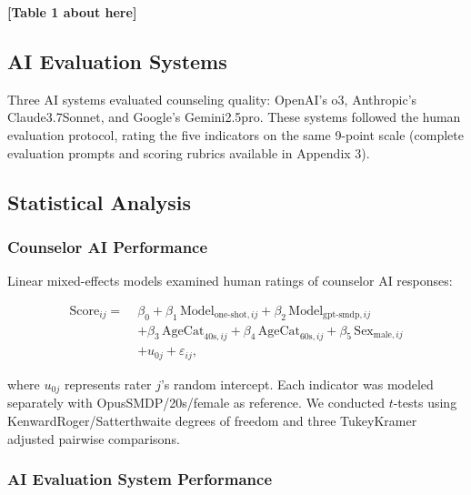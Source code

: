 \documentclass{wiley-article}
\begin{document}
\begin{center}
\textbf{[Table 1 about here]}
\end{center}

\subsection*{AI Evaluation Systems}

Three AI systems evaluated counseling quality: OpenAI's o3, Anthropic's Claude\textendash{}3.7\textendash{}Sonnet, and Google's Gemini\textendash{}2.5\textendash{}pro. These systems followed the human evaluation protocol, rating the five indicators on the same 9-point scale (complete evaluation prompts and scoring rubrics available in Appendix 3).

\subsection*{Statistical Analysis}

\subsubsection*{Counselor AI Performance}

Linear mixed-effects models examined human ratings of counselor AI responses:

\begin{equation}
\begin{aligned}
\mathrm{Score}_{ij} =\;& 
\beta_{0}
+ \beta_{1}\,\mathrm{Model}_{\text{one-shot},ij}
+ \beta_{2}\,\mathrm{Model}_{\text{gpt-smdp},ij} \\
& + \beta_{3}\,\mathrm{AgeCat}_{40\text{s},ij}
+ \beta_{4}\,\mathrm{AgeCat}_{60\text{s},ij}
+ \beta_{5}\,\mathrm{Sex}_{\text{male},ij} \\
& + u_{0j}
+ \varepsilon_{ij},
\end{aligned}
\end{equation}

where $u_{0j}$ represents rater $j$'s random intercept. Each indicator was modeled separately with Opus\textendash{}SMDP/20s/female as reference. We conducted $t$-tests using Kenward\textendash{}Roger/Satterthwaite degrees of freedom and three Tukey\textendash{}Kramer adjusted pairwise comparisons.

\subsubsection*{AI Evaluation System Performance}
\end{document}
